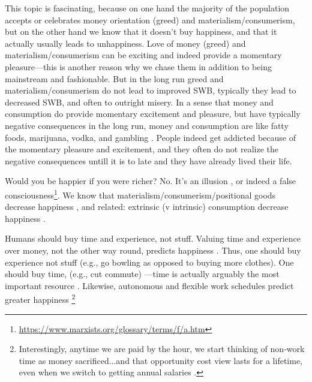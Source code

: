 \documentclass[10pt, letterpaper]{article}
\begin{document}
\begin{spacing}{1.8}
This topic is fascinating, because on one hand the majority of the population
accepts or celebrates money orientation (greed) and materialism/consumerism, but on the other hand
we know that it doesn't buy happiness, and that it actually usually leads to
unhappiness. Love of money (greed) and materialism/consumerism can be
exciting and indeed provide a momentary pleasure---this is another reason why we
chase them in addition to being mainstream and fashionable. 
But in the long run greed and materialism/consumerism do not lead to improved SWB, typically they lead to decreased SWB, and often to outright misery. In a
sense that money and consumption do provide momentary excitement and pleasure,
but have typically negative consequences in the long run, money and consumption
are like fatty foods, marijuana, vodka, and gambling \citep{linden11}. People
indeed get addicted because of the momentary pleasure and excitement, and they
often do not realize the negative consequences untill it is to late and they
have already lived their life. 
%
%
%

Would you be happier if you were richer? No. It's an illusion \citep{kahneman06c}, or indeed
a false consciousness\footnote{\url{https://www.marxists.org/glossary/terms/f/a.htm}}.
We know that materialism/consumerism/positional goods decrease happiness 
\cite{kasser16,dittmar14,brown05,kasser13,schmuck00,kasser93,leonard10}, and
related: 
extrinsic (v intrinsic) consumption decrease happiness 
\citep{ryan00,ryan99,morrison17}.

Humans should buy time and experience, not stuff. 
Valuing time and experience over money, not the other way round, predicts happiness \citep{whillans2019valuing}.
Thus, one should buy experience not stuff (e.g., go bowling as opposed to buying more clothes)\citep{putnam01,kasser16,dittmar14}. One should buy time, (e.g., cut commute)  %
---time is actually arguably the most important resource \citep{whillans17}. Likewise, autonomous and flexible work schedules predict greater happiness \citep{gssLonnie18,aokLead17,farber16sep15,golden06w,golden13}\footnote{Interestingly, anytime we are paid by the hour, we start thinking of non-work time as money sacrificed...and that opportunity cost view lasts for a lifetime, even when we switch to getting annual salaries \citep{devoe19}.}


\end{spacing}
\end{document}
